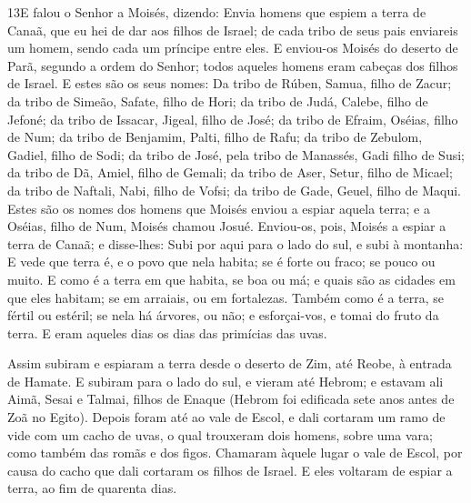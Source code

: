 \lettrine{13} E falou o Senhor a Moisés, dizendo: Envia
homens que espiem a terra de Canaã, que eu hei de dar aos filhos de
Israel; de cada tribo de seus pais enviareis um homem, sendo cada um
príncipe entre eles. E enviou-os Moisés do deserto de Parã,
segundo a ordem do Senhor; todos aqueles homens eram cabeças dos
filhos de Israel. E estes são os seus nomes: Da tribo de Rúben,
Samua, filho de Zacur; da tribo de Simeão, Safate, filho de
Hori; da tribo de Judá, Calebe, filho de Jefoné; da tribo de
Issacar, Jigeal, filho de José; da tribo de Efraim, Oséias,
filho de Num; da tribo de Benjamim, Palti, filho de Rafu;
da tribo de Zebulom, Gadiel, filho de Sodi; da tribo
de José, pela tribo de Manassés, Gadi filho de Susi; da tribo
de Dã, Amiel, filho de Gemali; da tribo de Aser, Setur, filho
de Micael; da tribo de Naftali, Nabi, filho de Vofsi;
da tribo de Gade, Geuel, filho de Maqui. Estes são os
nomes dos homens que Moisés enviou a espiar aquela terra; e a
Oséias, filho de Num, Moisés chamou Josué. Enviou-os, pois,
Moisés a espiar a terra de Canaã; e disse-lhes: Subi por aqui para o
lado do sul, e subi à montanha: E vede que terra é, e o povo
que nela habita; se é forte ou fraco; se pouco ou muito. E
como é a terra em que habita, se boa ou má; e quais são as cidades
em que eles habitam; se em arraiais, ou em fortalezas. Também
como é a terra, se fértil ou estéril; se nela há árvores, ou não; e
esforçai-vos, e tomai do fruto da terra. E eram aqueles dias os dias
das primícias das uvas.

Assim subiram e espiaram a terra desde o deserto de Zim, até
Reobe, à entrada de Hamate. E subiram para o lado do sul, e
vieram até Hebrom; e estavam ali Aimã, Sesai e Talmai, filhos de
Enaque (Hebrom foi edificada sete anos antes de Zoã no Egito).
Depois foram até ao vale de Escol, e dali cortaram um ramo de
vide com um cacho de uvas, o qual trouxeram dois homens, sobre uma
vara; como também das romãs e dos figos. Chamaram àquele
lugar o vale de Escol, por causa do cacho que dali cortaram os
filhos de Israel. E eles voltaram de espiar a terra, ao fim
de quarenta dias.

